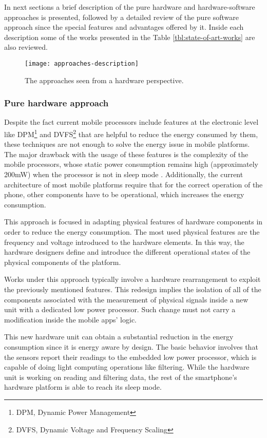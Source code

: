 In next sections a brief description of the pure hardware and hardware-software approaches is presented, followed by a detailed review of the pure software approach since the special features and advantages offered by it.
Inside each description some of the works presented in the Table \ref{tbl:state-of-art-works} are also reviewed.

\begin{figure}
\centering
\texttt{[image: approaches-description]}
\caption[Approaches seen from hardware perspective]{The approaches seen from a hardware perspective.}
\label{fig:approaches-description}
\end{figure}

\subsubsection{Pure hardware approach}

Despite the fact current mobile processors include features at the electronic level like DPM\footnote{DPM, Dynamic Power Management} and DVFS\footnote{DVFS, Dynamic Voltage and Frequency Scaling} that are helpful to reduce the energy consumed by them, these techniques are not enough to solve the energy issue in mobile platforms.
The major drawback with the usage of these features is the complexity of the mobile processors, whose static power consumption remains high (approximately 200mW) when the processor is not in sleep mode \cite{Priyantha2011}.
Additionally, the current architecture of most mobile platforms require that for the correct operation of the phone, other components have to be operational, which increases the energy consumption.

This approach is focused in adapting physical features of hardware components in order to reduce the energy consumption.
The most used physical features are the frequency and voltage introduced to the hardware elements.
In this way, the hardware designers define and introduce the different operational states of the physical components of the platform.

Works under this approach typically involve a hardware rearrangement to exploit the previously mentioned features.
This redesign implies the isolation of all of the components associated with the measurement of physical signals inside a new unit with a dedicated low power processor.
Such change must not carry a modification inside the mobile apps' logic.

This new hardware unit can obtain a substantial reduction in the energy consumption since it is energy aware by design.
The basic behavior involves that the sensors report their readings to the embedded low power processor, which is capable of doing light computing operations like filtering.
While the hardware unit is working on reading and filtering data, the rest of the smartphone's hardware platform is able to reach its sleep mode.


